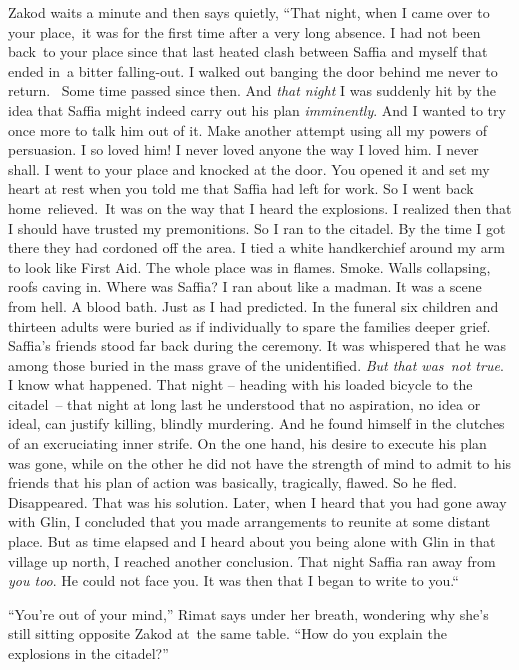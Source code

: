 \documentclass[twoside,11pt]{book}
\begin{document}
Zakod waits a minute and then says quietly, ``That night, when I came over to your
place,{\ }it was for the first time after a very long absence. I had not been
back{\ }to your place since that last heated clash between Saffia and myself
that ended in~a bitter falling-out. I walked out banging the door behind me never to return. ~Some time passed since
then. And \textit{that night} I was suddenly hit by the idea that Saffia might indeed carry out his plan
\textit{imminently}. And I wanted to try once more to talk him out of it. Make another attempt using all my powers of
persuasion. I so loved him! I never loved anyone the way I loved him. I never shall. I went to your place and knocked
at the door. You opened it and set my heart at rest when you told me that Saffia had left for work. So I went back
home\ relieved.\  It was on the way that I heard the explosions. I realized then that I should have trusted my
premonitions. So I ran to the citadel. By the time I got there they had cordoned off the area. I tied a white
handkerchief around my arm to look like First Aid. The whole place was in flames. Smoke. Walls collapsing, roofs caving
in. Where was Saffia? I ran about like a madman. It was a scene from hell. A blood bath. Just as I had predicted. In
the funeral six children and thirteen adults were buried as if individually to spare the families deeper grief.
Saffia's friends stood far back during the ceremony. It was whispered that he was among those buried in the mass grave
of the unidentified. \textit{But that was~not true}. I know what happened. That night -- heading with his loaded
bicycle to the citadel\ {}-- that night at long last he understood that no aspiration, no idea or ideal, can justify
killing, blindly murdering. And he found himself in the clutches of an excruciating inner strife. On the one hand, his
desire to execute his plan was gone, while on the other he did not have the strength of mind to admit to his friends
that his plan of action was basically, tragically, flawed. So he fled. Disappeared. That was his solution. Later, when
I heard that you had gone away with Glin, I concluded that you made arrangements to reunite at some distant place. But
as time elapsed and I heard about you being alone with Glin in that village up north, I reached another conclusion.
That night Saffia ran away from\textit{ you too}. He could not face you. It was then that I began to write to
you.``\ 

``You're out of your mind,'' Rimat says under her breath, wondering why she's still sitting
opposite Zakod at~the same table. ``How do you explain the explosions in the citadel?'' 
\end{document}
